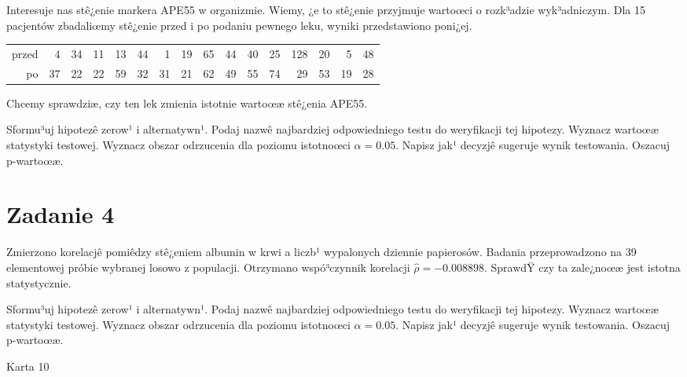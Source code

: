 \documentclass[a4paper,12pt]{article}
\begin{document}
  Interesuje nas stê¿enie markera APE55  w organizmie. 
  Wiemy, ¿e to stê¿enie przyjmuje wartoœci o rozk³adzie wyk³adniczym. 
  Dla 15 pacjentów zbadaliœmy stê¿enie przed i po podaniu pewnego leku, 
  wyniki przedstawiono poni¿ej.
  
  \vspace{0.5cm} 
  \noindent\begin{center} 
\begin{tabular}{rrrrrrrrrrrrrrrr}
  \hline
  \hline
przed & 4 & 34 & 11 & 13 & 44 & 1 & 19 & 65 & 44 & 40 & 25 & 128 & 20 & 5 & 48 \\
  po & 37 & 22 & 22 & 59 & 32 & 31 & 21 & 62 & 49 & 55 & 74 & 29 & 53 & 19 & 28 \\
   \hline
\end{tabular}
 
  \end{center} 
  \vspace{0.5cm}
  
  Chcemy sprawdziæ, czy ten lek zmienia istotnie wartoœæ stê¿enia APE55.
  
  Sformu³uj hipotezê zerow¹ i alternatywn¹. 
  Podaj nazwê najbardziej odpowiedniego testu do weryfikacji tej hipotezy. 
  Wyznacz wartoœæ statystyki testowej. 
  Wyznacz obszar odrzucenia dla poziomu istotnoœci $\alpha=0.05$. 
  Napisz jak¹ decyzjê sugeruje wynik testowania. Oszacuj p-wartoœæ. \vspace{1cm} 

  \section*{Zadanie 4}
     
     Zmierzono korelacjê pomiêdzy stê¿eniem albumin w krwi a liczb¹ wypalonych dziennie papierosów. 
     Badania przeprowadzono na 39 elementowej próbie wybranej losowo z populacji. 
     Otrzymano wspó³czynnik korelacji $\hat\rho = -0.008898 $. 
     SprawdŸ czy ta zale¿noœæ jest istotna statystycznie. 
     
     Sformu³uj hipotezê zerow¹ i alternatywn¹. 
     Podaj nazwê najbardziej odpowiedniego testu do weryfikacji tej hipotezy. 
     Wyznacz wartoœæ statystyki testowej. 
     Wyznacz obszar odrzucenia dla poziomu istotnoœci $\alpha=0.05$. 
     Napisz jak¹ decyzjê sugeruje wynik testowania. 
     Oszacuj p-wartoœæ. \vspace{1cm} 

  \clearpage  Karta  10  
\end{document}
